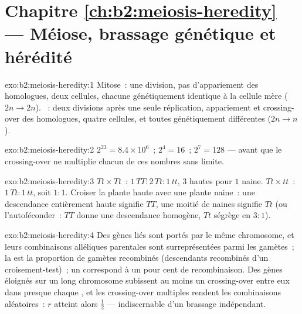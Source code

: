 \section*{Chapitre \ref{ch:b2:meiosis-heredity} --- Méiose, brassage génétique et hérédité}

\begin{solution}{exo:b2:meiosis-heredity:1}
Mitose~: une division, pas d'appariement des homologues, deux cellules,
chacune génétiquement identique à la cellule mère ($2n \to 2n$).
~: deux divisions après une seule réplication, appariement et
crossing-over des homologues, quatre cellules,  et toutes
génétiquement différentes ($2n \to n$).
\end{solution}

\begin{solution}{exo:b2:meiosis-heredity:2}
$2^{23} = 8.4\times 10^{6}$~; $2^{4} = 16$~; $2^{7} = 128$ --- avant
que le crossing-over ne multiplie chacun de ces nombres sans limite.
\end{solution}

\begin{solution}{exo:b2:meiosis-heredity:3}
$Tt\times Tt$~:  $1\,TT : 2\,Tt : 1\,tt$,  $3$ hautes
pour $1$ naine. $Tt\times tt$~: $1\,Tt : 1\,tt$, soit $1 : 1$. Croiser
la plante haute avec une plante naine~: une descendance entièrement
haute signifie $TT$, une moitié de naines signifie $Tt$
(ou l'autoféconder~: $TT$ donne une descendance homogène, $Tt$ ségrège
en $3 : 1$).
\end{solution}

\begin{solution}{exo:b2:meiosis-heredity:4}
Des gènes liés sont portés par le même chromosome, et leurs combinaisons
alléliques parentales sont surreprésentées parmi les gamètes~; la
 est la proportion de gamètes recombinés
(descendants recombinés d'un croisement-test)~; un 
correspond à un pour cent de recombinaison. Des gènes éloignés sur un
long chromosome subissent au moins un crossing-over entre eux dans
presque chaque , et les crossing-over multiples rendent les
combinaisons aléatoires~: $r$ atteint alors $\tfrac12$ ---
indiscernable d'un brassage indépendant.
\end{solution}

